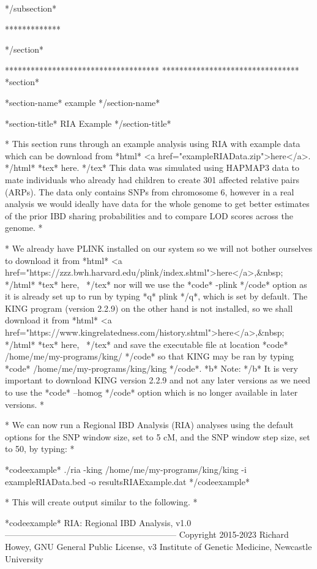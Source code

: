 */subsection*

*************

*/section*

************************************
********************************
*section*

*section-name*
example
*/section-name*

*section-title*
RIA Example
*/section-title*

*
This section runs through an example analysis using RIA with example data which can be download from *html* <a href="exampleRIAData.zip">here</a>. */html* *tex* here. */tex* This data was simulated using HAPMAP3 data to mate individuals who already had children to create 301 affected relative pairs (ARPs). The data only contains SNPs from chromosome 6, however in a real analysis we would ideally have data for the whole genome to get better estimates of the prior IBD sharing probabilities and to compare LOD scores across the genome.
*

*
We already have PLINK installed on our system so we will not bother ourselves to download it from *html* <a href="https://zzz.bwh.harvard.edu/plink/index.shtml">here</a>,&nbsp; */html* *tex* here,~ */tex* nor will we use the *code* -plink */code* option as it is already set up to run by typing *q* plink */q*, which is set by default. The KING program (version 2.2.9) on the other hand is not installed, so we shall download it from *html* <a href="https://www.kingrelatedness.com/history.shtml">here</a>,&nbsp; */html* *tex* here,~ */tex* and save the executable file at location *code* /home/me/my-programs/king/ */code* so that KING may be ran by typing *code* /home/me/my-programs/king/king */code*. *b* Note: */b* It is very important to download KING version 2.2.9 and not any later versions as we need to use the *code* --homog */code* option which is no longer available in later versions.
*

*
We can now run a Regional IBD Analysis (RIA) analyses using the default options for the SNP window size, set to 5 cM, and the SNP window step size, set to 50, by typing:
*

*codeexample*
./ria -king /home/me/my-programs/king/king -i exampleRIAData.bed -o resultsRIAExample.dat
*/codeexample*

*
This will create output similar to the following.
*

*codeexample*
RIA: Regional IBD Analysis, v1.0
------------------------------------------------------------
Copyright 2015-2023 Richard Howey, GNU General Public License, v3
Institute of Genetic Medicine, Newcastle University

